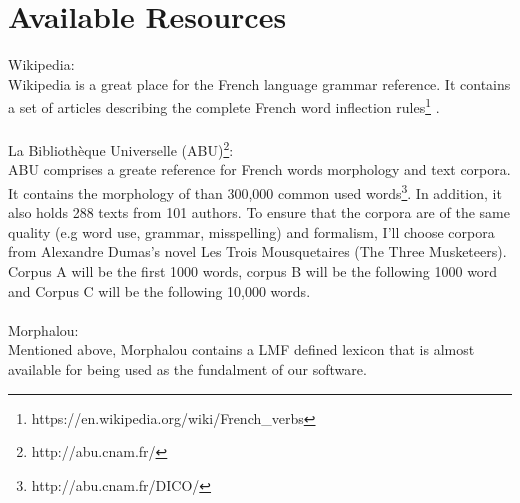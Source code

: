 \documentclass[11pt,letterpaper]{article}
\begin{document}
\section{Available Resources}

Wikipedia:\\
\indent Wikipedia is a great place for the French language grammar reference. It contains a set of articles describing the complete French word inflection rules\footnote{https://en.wikipedia.org/wiki/French\_verbs} .\\
\\
La Bibliothèque Universelle (ABU)\footnote{http://abu.cnam.fr/}:\\
\indent ABU comprises a greate reference for French words morphology and text corpora. It contains the morphology of than 300,000 common used words\footnote{http://abu.cnam.fr/DICO/}. In addition, it also holds 288 texts from 101 authors. To ensure that the corpora are of the same quality (e.g word use, grammar, misspelling) and formalism, I'll choose corpora from Alexandre Dumas's novel Les Trois Mousquetaires (The Three Musketeers). Corpus A will be the first 1000 words, corpus B will be the following 1000 word and Corpus C will be the following 10,000 words.\\
\\
Morphalou:\\
\indent Mentioned above, Morphalou contains a LMF defined lexicon that is almost available for being used as the fundalment of our software.\\
\end{document}
